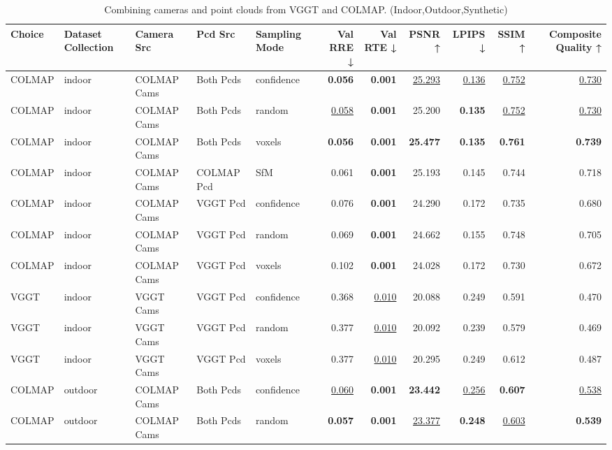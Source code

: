 \begin{table}[H]
\caption{\ifdefined\customcaption \customcaption \else Combining cameras and point clouds from VGGT and COLMAP. (Indoor,Outdoor,Synthetic) \fi}
\label{tab:07_combined_single_indoor,outdoor,synthetic}
\centering
\tiny
\begin{tabular}{lllllrrrrrr}
\toprule
Choice & Dataset Collection & Camera Src & Pcd Src & Sampling Mode & Val RRE ↓ & Val RTE ↓ & PSNR ↑ & LPIPS ↓ & SSIM ↑ & Composite Quality ↑ \\
\midrule
COLMAP & indoor & COLMAP Cams & Both Pcds & confidence & \textbf{0.056} & \textbf{0.001} & \underline{25.293} & \underline{0.136} & \underline{0.752} & \underline{0.730} \\
COLMAP & indoor & COLMAP Cams & Both Pcds & random & \underline{0.058} & \textbf{0.001} & 25.200 & \textbf{0.135} & \underline{0.752} & \underline{0.730} \\
COLMAP & indoor & COLMAP Cams & Both Pcds & voxels & \textbf{0.056} & \textbf{0.001} & \textbf{25.477} & \textbf{0.135} & \textbf{0.761} & \textbf{0.739} \\
COLMAP & indoor & COLMAP Cams & COLMAP Pcd & SfM & 0.061 & \textbf{0.001} & 25.193 & 0.145 & 0.744 & 0.718 \\
COLMAP & indoor & COLMAP Cams & VGGT Pcd & confidence & 0.076 & \textbf{0.001} & 24.290 & 0.172 & 0.735 & 0.680 \\
COLMAP & indoor & COLMAP Cams & VGGT Pcd & random & 0.069 & \textbf{0.001} & 24.662 & 0.155 & 0.748 & 0.705 \\
COLMAP & indoor & COLMAP Cams & VGGT Pcd & voxels & 0.102 & \textbf{0.001} & 24.028 & 0.172 & 0.730 & 0.672 \\
VGGT & indoor & VGGT Cams & VGGT Pcd & confidence & 0.368 & \underline{0.010} & 20.088 & 0.249 & 0.591 & 0.470 \\
VGGT & indoor & VGGT Cams & VGGT Pcd & random & 0.377 & \underline{0.010} & 20.092 & 0.239 & 0.579 & 0.469 \\
VGGT & indoor & VGGT Cams & VGGT Pcd & voxels & 0.377 & \underline{0.010} & 20.295 & 0.249 & 0.612 & 0.487 \\
\midrule
COLMAP & outdoor & COLMAP Cams & Both Pcds & confidence & \underline{0.060} & \textbf{0.001} & \textbf{23.442} & \underline{0.256} & \textbf{0.607} & \underline{0.538} \\
COLMAP & outdoor & COLMAP Cams & Both Pcds & random & \textbf{0.057} & \textbf{0.001} & \underline{23.377} & \textbf{0.248} & \underline{0.603} & \textbf{0.539} \\

\end{tabular}
\end{table}
